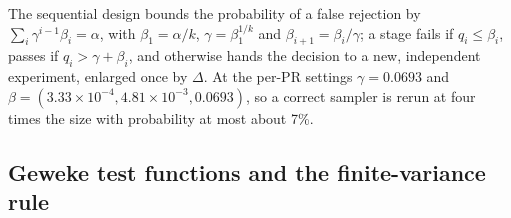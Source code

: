 The sequential design bounds the probability of a false rejection by
$\sum_i \gamma^{i-1}\beta_i = \alpha$, with $\beta_1 = \alpha/k$, $\gamma = \beta_1^{1/k}$ and
$\beta_{i+1} = \beta_i/\gamma$; a stage fails if $q_i \le \beta_i$, passes if $q_i > \gamma +
\beta_i$, and otherwise hands the decision to a new, independent experiment, enlarged once by
$\Delta$.
At the per-PR settings $\gamma = 0.0693$ and $\beta = (3.33\times10^{-4}, 4.81\times10^{-3},
0.0693)$, so a correct sampler is rerun at four times the size with probability at most about
7\%.

\begin{table}[!htbp]
\centering\small
\caption{G-small Geweke results for the 16 per-PR compositions: number of test functions
$G$, $t_{C-1}$ critical value, maximum $|z|$ and its argument, Gandy--Scott stage and Bonferroni
$q$, minimum relative numerical efficiency, and time, from runs at earlier commits (note under the
table); all 16 pass on the release commit.}
\label{tab:TabD1}

\end{table}

\subsection{Geweke test functions and the finite-variance rule}\label{app:geweke-functions}

